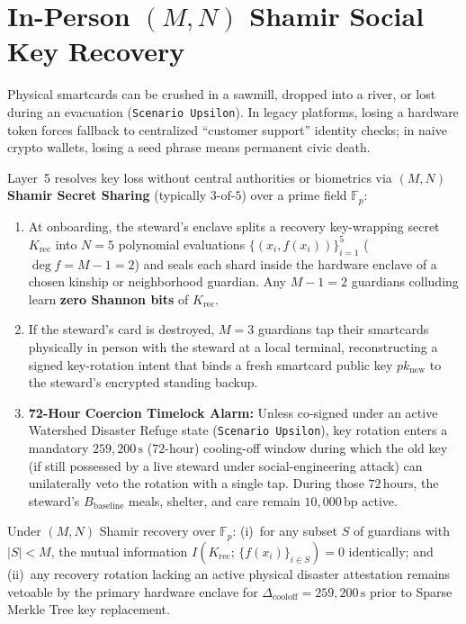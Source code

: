 \section{In-Person $(M, N)$ Shamir Social Key Recovery}
\label{sec:ch2-shamir-recovery}

Physical smartcards can be crushed in a sawmill, dropped into a river, or lost during an
evacuation (\texttt{Scenario Upsilon}). In legacy platforms, losing a hardware token forces
fallback to centralized ``customer support'' identity checks; in naive crypto wallets, losing a
seed phrase means permanent civic death.

Layer~5 resolves key loss without central authorities or biometrics via \textbf{$(M, N)$ Shamir Secret
Sharing} \parencite{shamir1979} (typically $3\text{-of-}5$) over a prime field $\mathbb{F}_p$:
\begin{enumerate}
\item At onboarding, the steward's enclave splits a recovery key-wrapping secret $K_{\mathrm{rec}}$
        into $N = 5$ polynomial evaluations $\{(x_i, f(x_i))\}_{i=1}^5$ ($\deg f = M - 1 = 2$)
        and seals each shard inside the hardware enclave of a chosen kinship or neighborhood
        guardian. Any $M - 1 = 2$ guardians colluding learn \textbf{zero Shannon bits} of
        $K_{\mathrm{rec}}$.
\item If the steward's card is destroyed, $M = 3$ guardians tap their smartcards physically in
        person with the steward at a local terminal, reconstructing a signed key-rotation intent
        that binds a fresh smartcard public key $pk_{\mathrm{new}}$ to the steward's encrypted
        standing backup.
\item \textbf{72-Hour Coercion Timelock Alarm:} Unless co-signed under an active Watershed
        Disaster Refuge state (\texttt{Scenario Upsilon}), key rotation enters a mandatory
        $259{,}200\,\mathrm{s}$ ($72\text{-hour}$) cooling-off window during which the old key
        (if still possessed by a live steward under social-engineering attack) can unilaterally
        veto the rotation with a single tap. During those $72\,\mathrm{hours}$, the steward's
        $B_{\mathrm{baseline}}$ meals, shelter, and care remain $10{,}000\,\mathrm{bp}$ active.
\end{enumerate}

\begin{invariant}
\label{inv:ch2-shamir-safety}
Under $(M, N)$ Shamir recovery over $\mathbb{F}_p$: (i)~for any subset $S$ of guardians with
$|S| < M$, the mutual information $I(K_{\mathrm{rec}};\, \{f(x_i)\}_{i \in S}) = 0$ identically;
and (ii)~any recovery rotation lacking an active physical disaster attestation remains vetoable
by the primary hardware enclave for $\Delta_{\mathrm{cooloff}} = 259{,}200\,\mathrm{s}$ prior to
Sparse Merkle Tree key replacement.
\end{invariant}

